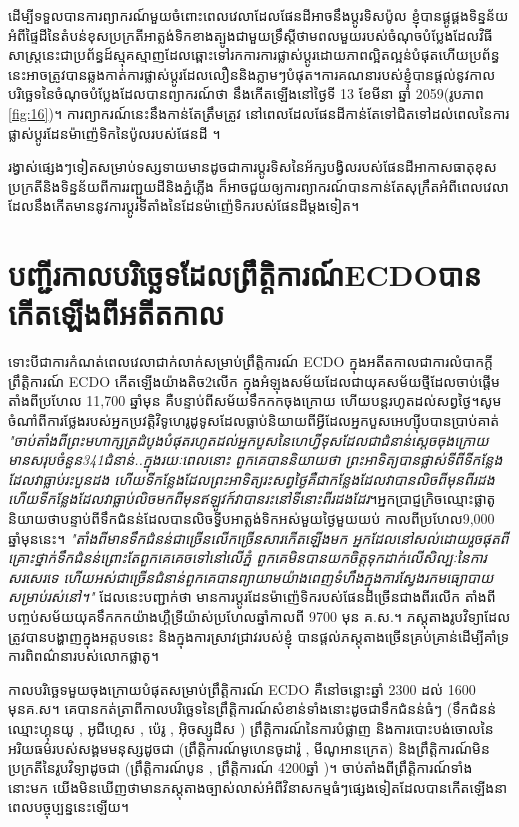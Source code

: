 \documentclass[10pt,twocolumn,letterpaper]{article}
\begin{document}
ដើម្បីទទួលបានការព្យាករណ៍មួយចំពោះពេលវេលាដែលផែនដីអាចនឹងប្តូរទិសប៉ូល ខ្ញុំបានផ្គូផ្គងទិន្នន័យអំពីផ្ទៃដីនៃតំបន់ខុសប្រក្រតីអាត្លង់ទិកខាងត្បូងជាមួយទ្រឹស្តីថាមពលមួយរបស់ចំណុចបំប្លែងដែលវិធីសាស្ត្រនេះជាប្រព័ន្ធដ៍ស្មុគស្មាញដែលឆ្ពោះទៅរកការការផ្លាស់ប្តូរដោយភាពល្អិតល្អន់បំផុត​ហើយប្រព័ន្ធនេះអាចត្រូវបានឆ្លងកាត់ការផ្លាស់ប្តូរដែលលឿននិងភ្លាមៗបំផុត។ការគណនារបស់ខ្ញុំបានផ្តល់នូវកាលបរិច្ឆេទនៃចំណុចបំប្លែងដែលបានព្យាករណ៍ថា នឹងកើតឡើងនៅថ្ងៃទី 13 ខែមីនា ឆ្នាំ 2059(រូបភាព \ref{fig:16})។ ការព្យាករណ៍នេះនឹងកាន់តែត្រឹមត្រូវ នៅពេលដែលផែនដីកាន់តែទៅជិតទៅដល់ពេលនៃការផ្លាស់ប្តូរដែនម៉ាញ៉េទិកនៃប៉ូលរបស់ផែនដី​ \cite{136}។

រង្វាស់ផ្សេងៗទៀតសម្រាប់ទស្សទាយមានដូចជាការប្តូរទិសនៃអ័ក្សបង្វិលរបស់ផែនដីអាកាសធាតុខុសប្រក្រតីនិងទិន្នន័យពីការរញ្ជួយដីនិងភ្នំភ្លើង ក៏អាចជួយឲ្យការព្យាករណ៍បានកាន់តែសុក្រឹតអំពីពេលវេលាដែលនឹងកើតមាននូវការប្តូរទីតាំងនៃដែនម៉ាញ៉េទិករបស់ផែនដីម្តងទៀត។

\section{បញ្ជីរកាលបរិច្ឆេទដែលព្រឹត្តិការណ៍​ECDO​បានកើតឡើងពីអតីតកាល}

ទោះបីជាការកំណត់ពេលវេលាជាក់លាក់សម្រាប់ព្រឹត្តិការណ៍ ECDO ក្នុងអតីតកាលជាការលំបាកក្តី​ព្រឹត្តិការណ៍ ECDO កើតឡើងយ៉ាងតិច2លើក ក្នុងអំឡុងសម័យដែលជាយុគសម័យថ្មីដែលចាប់ផ្តើមតាំងពីប្រហែល 11,700 ឆ្នាំមុន គឺបន្ទាប់ពីសម័យទឹកកកចុងក្រោយ ហើយបន្តរហូតដល់សព្វថ្ងៃ។សូមចំណាំពីការថ្លែងរបស់អ្នកប្រវត្តិវិទូហេរូដូទូសដែលធ្លាប់និយាយពីអ្វីដែលអ្នកបួសអេហ្ស៊ីបបានប្រាប់គាត់ \textit{"ចាប់តាំងពីព្រះមហាក្សត្រដំបូងបំផុតរហូតដល់អ្នកបួសនៃហេហ្វីទុសដែលជាជំនាន់ស្តេចចុងក្រោយ មានសរុបចំនួន341ជំនាន់..ក្នុងរយៈពេលនោះ ពួកគេបាននិយាយថា ព្រះអាទិត្យបានផ្លាស់ទីពីទីកន្លែងដែលវាធ្លាប់រះបួនដង ហើយទីកន្លែងដែលព្រះអាទិត្យរះសព្វថ្ងៃគឺជាកន្លែងដែលវាបានលិចពីមុនពីរដង ហើយទីកន្លែងដែលវាធ្លាប់លិចមកពីមុនឥឡូវក៍វាបានរះនៅទីនោះពីរដងដែរ}\cite{111}។អ្នកប្រាជ្ញក្រិចឈ្មោះ​ផ្លាតូ​និយាយថាបន្ទាប់ពីទឹកជំនន់ដែលបានលិចទ្វីបអាត្លង់ទិកអស់មួយថ្ងៃមួយយប់ កាលពីប្រហែល9,000 ឆ្នាំមុននេះ។ \textit{"តាំងពីមានទឹកជំនន់ជាច្រើនលើកច្រើនសារកើតឡើងមក អ្នកដែលនៅសល់ដោយរួចផុតពីគ្រោះថ្នាក់ទឹកជំនន់ព្រោះតែពួកគេគេចទៅនៅលើភ្នំ ពួកគេមិនបានយកចិត្តទុកដាក់លើសិល្បៈនៃការសរសេរទេ ហើយអស់ជាច្រើនជំនាន់ពួកគេបានព្យាយាមយ៉ាងពេញទំហឹងក្នុងការស្វែងរកមធ្យោបាយសម្រាប់រស់នៅ។"} \cite{112} ដែលនេះបញ្ជាក់ថា មានការប្តូរដែនម៉ាញ៉េទិករបស់ផែនដីច្រើនជាងពីរលើក តាំងពីបញ្ចប់សម័យយុគទឹកកក​យ៉ាងហ្គឺទ្រីយ៉ាស់​ប្រហែលឆ្នាំកាលពី 9700 មុន គ.ស.។ ភស្តុតាងរូបវិទ្យាដែលត្រូវបានបង្ហាញក្នុងអត្តបទនេះ និងក្នុងការស្រាវជ្រាវរបស់ខ្ញុំ\cite{2} បានផ្ដល់ភស្តុតាងច្រើនគ្រប់គ្រាន់ដើម្បីគាំទ្រការពិពណ៌នារបស់លោកផ្លាតូ។

កាលបរិច្ឆេទមួយចុងក្រោយបំផុតសម្រាប់ព្រឹត្តិការណ៍ ECDO គឺនៅចន្លោះឆ្នាំ 2300 ដល់ 1600 មុនគ.ស។ គេបានកត់ត្រាពីកាលបរិច្ឆេទនៃព្រឹត្តិការណ៍សំខាន់ទាំងនោះដូចជា​ទឹកជំនន់ធំៗ (ទឹកជំនន់ឈ្មោះហ្គុនយូ \cite{113,114,115}, អូជីហ្គេស \cite{116,117}, ប៉េរូ \cite{118,119}, អ៊ិចស្សូដឺស \cite{120}) ព្រឹត្តិការណ៍នៃការបំផ្លាញ និងការបោះបង់ចោលនៃអរិយធម៌របស់សង្គមមនុស្សដូចជា (ព្រឹត្តិការណ៍មូហេនចូ​ដារ៉ូ \cite{121}, មីណូអាន​ក្រេត\cite{100,101}) និងព្រឹត្តិការណ៍មិនប្រក្រតីនៃរូបវិទ្យាដូចជា (ព្រឹត្តិការណ៍បូន \cite{122}, ព្រឹត្តិការណ៍ 4200​ឆ្នាំ \cite{90})។ ចាប់តាំងពីព្រឹត្តិការណ៍ទាំងនោះមក យើងមិនឃើញថាមានភស្តុតាងច្បាស់លាស់អំពីវិនាសកម្មធំៗផ្សេងទៀតដែលបានកើតឡើងនាពេលបច្ចុប្បន្ននេះឡើយ។
\end{document}
